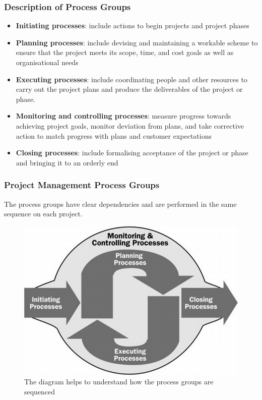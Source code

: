\documentclass[aspectratio=169]{beamer}
\begin{document}
\begin{frame}
\frametitle{Description of Process Groups}
\begin{itemize}
\item \textbf{Initiating processes}: include actions to begin projects and project phases
\item \textbf{Planning processes}: include devising and maintaining a workable scheme to ensure that the project meets its scope, time, and cost goals as well as organisational needs
\item \textbf{Executing processes}: include coordinating people and other resources to carry out the project plans and produce the deliverables of the project or phase.
\item \textbf{Monitoring and controlling processes}: measure progress towards achieving project goals, monitor deviation from plans, and take corrective action to match progress with plans and customer expectations
\item \textbf{Closing processes}: include formalising acceptance of the project or phase and bringing it to an orderly end
\end{itemize}
\end{frame}

\begin{frame}
\frametitle{Project Management Process Groups}
The process groups have clear dependencies and are performed in the same sequence on each project.
\begin{figure}
\includegraphics[scale=0.4]{process_seq}
\caption{The diagram helps to understand how the process groups are sequenced}
\end{figure}
\end{frame}
\end{document}
